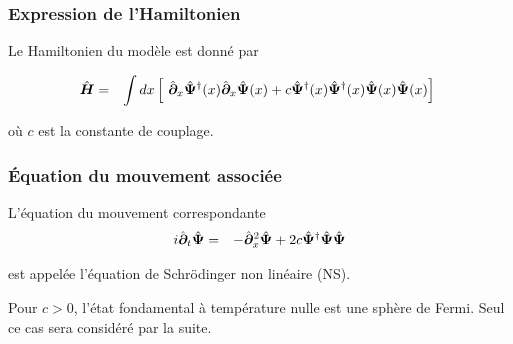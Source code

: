 
\subsubsection{Expression de l’Hamiltonien}
Le Hamiltonien du modèle est donné par

\begin{eqnarray}
	\operator{H} & = & \int dx \left [ \operator{\partial}_x \operator{\Psi}^\dag (x) \operator{\partial}_x \operator{\Psi}(x) + c \operator{\Psi}^\dag (x) \operator{\Psi}^\dag (x) \operator{\Psi} (x) \operator{\Psi} (x) \right ] 
\end{eqnarray}


où \( c \) est la constante de couplage. 

\subsubsection{Équation du mouvement associée}

L'équation du mouvement correspondante
\begin{eqnarray}
	i \hat{\bm{\partial}}_t \hat{\bm{\Psi}}	 & = & - \hat{\bm{\partial}}_x^2 \hat{\bm{\Psi}} + 2 c \hat{\bm{\Psi}}^\dag\hat{\bm{\Psi}} \hat{\bm{\Psi}}
\end{eqnarray}

est appelée l'équation de Schrödinger non linéaire (NS).

Pour $c > 0$, l'état fondamental à température nulle est une sphère de Fermi. Seul ce cas sera considéré par la suite. 
